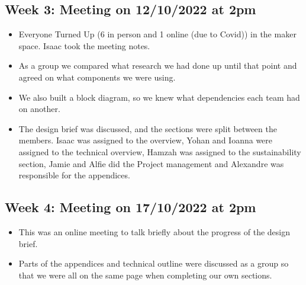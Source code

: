 \subsection*{Week 3: Meeting on 12/10/2022 at 2pm }
\begin{itemize}
    \item Everyone Turned Up (6 in person and 1 online (due to Covid)) in the maker space. Isaac took the meeting notes. 
    \item As a group we compared what research we had done up until that point and agreed on what components we were using. 
    \item We also built a block diagram, so we knew what dependencies each team had on another. 
    \item The design brief was discussed, and the sections were split between the members. Isaac was assigned to the overview, Yohan and Ioanna were assigned to the technical overview, Hamzah was assigned to the sustainability section, Jamie and Alfie did the Project management and Alexandre was responsible for the appendices.  
\end{itemize}
    
\subsection*{Week 4: Meeting on 17/10/2022 at 2pm }
\begin{itemize}
    \item This was an online meeting to talk briefly about the progress of the design brief. 
    \item Parts of the appendices and technical outline were discussed as a group so that we were all on the same page when completing our own sections. 
\end{itemize}

